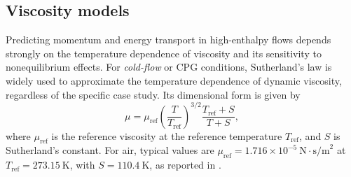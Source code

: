 




\subsection{Viscosity models}
Predicting momentum and energy transport in high-enthalpy flows depends strongly on the temperature dependence of viscosity and its sensitivity to nonequilibrium effects. For \textit{cold-flow} or \gls{CPG} conditions, Sutherland's law is widely used to approximate the temperature dependence of dynamic viscosity, regardless of the specific case study. Its dimensional form is given by
\begin{equation}
\mu = \mu_{\text{ref}} \left(\frac{T}{T_{\text{ref}}}\right)^{3/2} \frac{T_{\text{ref}} + S}{T + S},
\end{equation}
where $\mu_{\text{ref}}$ is the reference viscosity at the reference temperature $T_{\text{ref}}$, and $S$ is Sutherland's constant. For air, typical values are $\mu_{\text{ref}} = 1.716 \times 10^{-5}~\text{N}\!\cdot\!\text{s/m}^2$ at $T_{\text{ref}} = 273.15~\text{K}$, with $S = 110.4~\text{K}$, as reported in \citet{Hirschel2015}.

